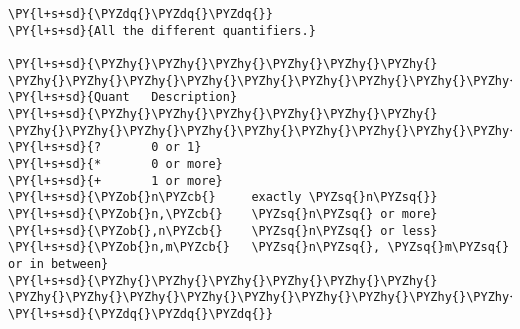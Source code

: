 

\section*{}

\begin{Verbatim}[commandchars=\\\{\}]
\PY{l+s+sd}{\PYZdq{}\PYZdq{}\PYZdq{}}
\PY{l+s+sd}{All the different quantifiers.}

\PY{l+s+sd}{\PYZhy{}\PYZhy{}\PYZhy{}\PYZhy{}\PYZhy{}\PYZhy{}  \PYZhy{}\PYZhy{}\PYZhy{}\PYZhy{}\PYZhy{}\PYZhy{}\PYZhy{}\PYZhy{}\PYZhy{}\PYZhy{}\PYZhy{}\PYZhy{}\PYZhy{}\PYZhy{}\PYZhy{}\PYZhy{}\PYZhy{}\PYZhy{}\PYZhy{}\PYZhy{}\PYZhy{}\PYZhy{}}
\PY{l+s+sd}{Quant   Description}
\PY{l+s+sd}{\PYZhy{}\PYZhy{}\PYZhy{}\PYZhy{}\PYZhy{}\PYZhy{}  \PYZhy{}\PYZhy{}\PYZhy{}\PYZhy{}\PYZhy{}\PYZhy{}\PYZhy{}\PYZhy{}\PYZhy{}\PYZhy{}\PYZhy{}\PYZhy{}\PYZhy{}\PYZhy{}\PYZhy{}\PYZhy{}\PYZhy{}\PYZhy{}\PYZhy{}\PYZhy{}\PYZhy{}\PYZhy{}}
\PY{l+s+sd}{?       0 or 1}
\PY{l+s+sd}{*       0 or more}
\PY{l+s+sd}{+       1 or more}
\PY{l+s+sd}{\PYZob{}n\PYZcb{}     exactly \PYZsq{}n\PYZsq{}}
\PY{l+s+sd}{\PYZob{}n,\PYZcb{}    \PYZsq{}n\PYZsq{} or more}
\PY{l+s+sd}{\PYZob{},n\PYZcb{}    \PYZsq{}n\PYZsq{} or less}
\PY{l+s+sd}{\PYZob{}n,m\PYZcb{}   \PYZsq{}n\PYZsq{}, \PYZsq{}m\PYZsq{} or in between}
\PY{l+s+sd}{\PYZhy{}\PYZhy{}\PYZhy{}\PYZhy{}\PYZhy{}\PYZhy{}  \PYZhy{}\PYZhy{}\PYZhy{}\PYZhy{}\PYZhy{}\PYZhy{}\PYZhy{}\PYZhy{}\PYZhy{}\PYZhy{}\PYZhy{}\PYZhy{}\PYZhy{}\PYZhy{}\PYZhy{}\PYZhy{}\PYZhy{}\PYZhy{}\PYZhy{}\PYZhy{}\PYZhy{}\PYZhy{}}
\PY{l+s+sd}{\PYZdq{}\PYZdq{}\PYZdq{}}
\end{Verbatim}
